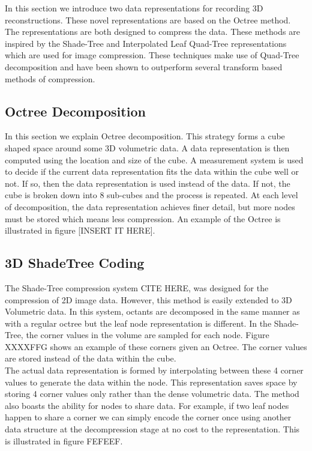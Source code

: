 In this section we introduce two data representations for recording 3D reconstructions. These novel representations are based on the Octree method. The representations are both designed to compress the data. These methods are inspired by the Shade-Tree and Interpolated Leaf Quad-Tree representations \cite{Gonzalez07ShadeTree, Lincoln13Interpolating} which are used for image compression. These techniques make use of Quad-Tree decomposition and have been shown to outperform several transform based methods of compression. 

\subsection{Octree Decomposition}

In this section we explain Octree decomposition. This strategy forms a cube shaped space around some 3D volumetric data. A data representation is then computed using the location and size of the cube. A measurement system is used to decide if the current data representation fits the data within the cube well or not. If so, then the data representation is used instead of the data. If not, the cube is broken down into 8 sub-cubes and the process is repeated. At each level of decomposition, the data representation achieves finer detail, but more nodes must be stored which means less compression. An example of the Octree is illustrated in figure [INSERT IT HERE].


\subsection{3D ShadeTree Coding}

The Shade-Tree compression system CITE HERE, was designed for the compression of 2D image data. However, this method is easily extended to 3D Volumetric data. In this system, octants are decomposed in the same manner as with a regular octree but the leaf node representation is different. In the Shade-Tree, the corner values in the volume are sampled for each node. Figure XXXXFFG shows an example of these corners given an Octree. The corner values are stored instead of the data within the cube. \\


The actual data representation is formed by interpolating between these 4 corner values to generate the data within the node. This representation saves space by storing 4 corner values only rather than the dense volumetric data. The method also boasts the ability for nodes to share data. For example, if two leaf nodes happen to share a corner we can simply encode the corner once using another data structure at the decompression stage at no cost to the representation. This is illustrated in figure FEFEEF. \\

